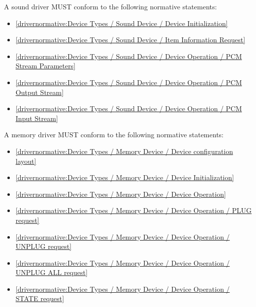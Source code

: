 A sound driver MUST conform to the following normative statements:

\begin{itemize}
\item \ref{drivernormative:Device Types / Sound Device / Device Initialization}
\item \ref{drivernormative:Device Types / Sound Device / Item Information Request}
\item \ref{drivernormative:Device Types / Sound Device / Device Operation / PCM Stream Parameters}
\item \ref{drivernormative:Device Types / Sound Device / Device Operation / PCM Output Stream}
\item \ref{drivernormative:Device Types / Sound Device / Device Operation / PCM Input Stream}
\end{itemize}

\label{sec:Conformance / Driver Conformance / Memory Driver Conformance}

A memory driver MUST conform to the following normative statements:

\begin{itemize}
\item \ref{drivernormative:Device Types / Memory Device / Device configuration layout}
\item \ref{drivernormative:Device Types / Memory Device / Device Initialization}
\item \ref{drivernormative:Device Types / Memory Device / Device Operation}
\item \ref{drivernormative:Device Types / Memory Device / Device Operation / PLUG request}
\item \ref{drivernormative:Device Types / Memory Device / Device Operation / UNPLUG request}
\item \ref{drivernormative:Device Types / Memory Device / Device Operation / UNPLUG ALL request}
\item \ref{drivernormative:Device Types / Memory Device / Device Operation / STATE request}
\end{itemize}

\label{sec:Conformance / Driver Conformance / I2C Adapter Driver Conformance}


